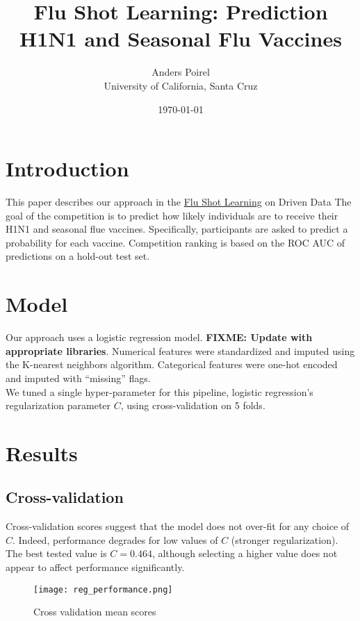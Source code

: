 \documentclass{article}[12pt]
\title{Flu Shot Learning: Prediction H1N1 and Seasonal Flu Vaccines}
\author{Anders Poirel \\ University of California, Santa Cruz}
\date{\today}
\begin{document}
    
\maketitle

\section{Introduction}

This paper describes our approach in 
the \href{https://www.drivendata.org/competitions/66/flu-shot-learning/}{Flu Shot Learning}
on Driven Data \cite{driven-data}
The goal of the competition is to predict how likely individuals are to receive their 
H1N1 and seasonal flue vaccines. Specifically, participants are asked to predict a 
probability for each vaccine. Competition ranking is based on the ROC AUC of predictions 
on a hold-out test set.

\section{Model}

Our approach uses a logistic regression model. 
\textbf{FIXME: Update with appropriate libraries}.
Numerical features were standardized and imputed using the K-nearest neighbors
algorithm. Categorical features were one-hot encoded and imputed with ``missing''
flags. \\
We tuned a single hyper-parameter for this pipeline, logistic regression's regularization
parameter $C$, using cross-validation on 5 folds. 

\section{Results}

\subsection{Cross-validation}

Cross-validation scores suggest that the model does not over-fit for any choice
of $C$. Indeed, performance degrades for low values of $C$ (stronger regularization).
The best tested value is $C = 0.464$, although selecting a higher value does not 
appear to affect performance significantly.

\begin{figure}
\caption{Cross validation mean scores}
\texttt{[image: reg\_performance.png]}
\end{figure}
\end{document}
